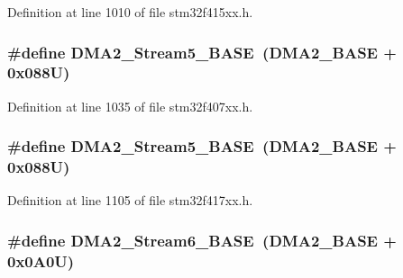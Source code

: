 Definition at line 1010 of file stm32f415xx.\+h.

\subsubsection[{\texorpdfstring{D\+M\+A2\+\_\+\+Stream5\+\_\+\+B\+A\+SE}{DMA2_Stream5_BASE}}]{\setlength{\rightskip}{0pt plus 5cm}\#define D\+M\+A2\+\_\+\+Stream5\+\_\+\+B\+A\+SE~({\bf D\+M\+A2\+\_\+\+B\+A\+SE} + 0x088\+U)}\hypertarget{group___peripheral__registers__structures_gaed1460fdc407b6decfbffccb0260d0af}{}\label{group___peripheral__registers__structures_gaed1460fdc407b6decfbffccb0260d0af}


Definition at line 1035 of file stm32f407xx.\+h.

\subsubsection[{\texorpdfstring{D\+M\+A2\+\_\+\+Stream5\+\_\+\+B\+A\+SE}{DMA2_Stream5_BASE}}]{\setlength{\rightskip}{0pt plus 5cm}\#define D\+M\+A2\+\_\+\+Stream5\+\_\+\+B\+A\+SE~({\bf D\+M\+A2\+\_\+\+B\+A\+SE} + 0x088\+U)}\hypertarget{group___peripheral__registers__structures_gaed1460fdc407b6decfbffccb0260d0af}{}\label{group___peripheral__registers__structures_gaed1460fdc407b6decfbffccb0260d0af}


Definition at line 1105 of file stm32f417xx.\+h.

\subsubsection[{\texorpdfstring{D\+M\+A2\+\_\+\+Stream6\+\_\+\+B\+A\+SE}{DMA2_Stream6_BASE}}]{\setlength{\rightskip}{0pt plus 5cm}\#define D\+M\+A2\+\_\+\+Stream6\+\_\+\+B\+A\+SE~({\bf D\+M\+A2\+\_\+\+B\+A\+SE} + 0x0\+A0\+U)}\hypertarget{group___peripheral__registers__structures_ga5e81174c96fd204fa7c82c815e85c8e6}{}\label{group___peripheral__registers__structures_ga5e81174c96fd204fa7c82c815e85c8e6}


